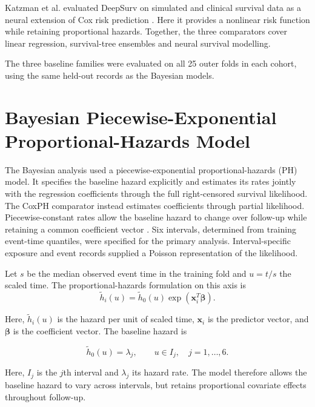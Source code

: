 Katzman et al. evaluated DeepSurv on simulated and clinical survival data as a neural extension of Cox risk prediction \cite{ref4}. Here it provides a nonlinear risk function while retaining proportional hazards. Together, the three comparators cover linear regression, survival-tree ensembles and neural survival modelling.

The three baseline families were evaluated on all 25 outer folds in each cohort, using the same held-out records as the Bayesian models.

\section{Bayesian Piecewise-Exponential Proportional-Hazards Model}\label{bayesian-piecewise-exponential-proportional-hazards-model}

The Bayesian analysis used a piecewise-exponential proportional-hazards (PH) model. It specifies the baseline hazard explicitly and estimates its rates jointly with the regression coefficients through the full right-censored survival likelihood. The CoxPH comparator instead estimates coefficients through partial likelihood. Piecewise-constant rates allow the baseline hazard to change over follow-up while retaining a common coefficient vector \cite{ref22,ref23}. Six intervals, determined from training event-time quantiles, were specified for the primary analysis. Interval-specific exposure and event records supplied a Poisson representation of the likelihood.

Let $s$ be the median observed event time in the training fold and $u=t/s$ the scaled time. The proportional-hazards formulation on this axis is
\begin{equation}
    \widetilde h_{i}(u) = \widetilde h_{0}(u)\exp\left( \mathbf{x}_{i}^{T}\mathbf{\beta} \right).
\end{equation}


Here, $\widetilde h_i(u)$ is the hazard per unit of scaled time, $\mathbf{x}_i$ is the predictor vector, and $\boldsymbol{\beta}$ is the coefficient vector. The baseline hazard is

\begin{equation}
    \widetilde h_{0}(u) = \lambda_{j},\quad\quad u \in I_{j},\quad j = 1,\ldots,6.
\end{equation}


Here, $I_j$ is the $j$th interval and $\lambda_j$ its hazard rate. The model therefore allows the baseline hazard to vary across intervals, but retains proportional covariate effects throughout follow-up.

